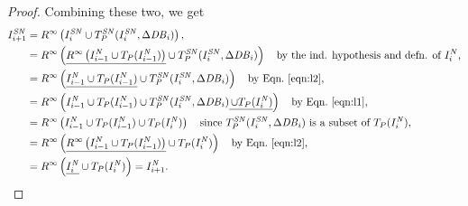 \begin{proof}
    Combining these two, we get
    \begin{align}
        I_{i+1}^{\mathit{SN}} &= R^\infty\left(I_i^{\mathit{SN}} \cup T_P^{\mathit{SN}} (I^{\mathit{SN}}_i, \Delta\mathit{DB}_i)\right),\\
        &= R^\infty\left(
            \underline{R^\infty\left(I^{\mathit{N}}_{i-1}\cup T_P(I^{\mathit{N}}_{i-1}) \right)}
        \cup T_P^{\mathit{SN}} (I^{\mathit{SN}}_i, \Delta\mathit{DB}_i)\right)\text{\quad by the ind. hypothesis and defn. of $I^N_i$,}\\
        &= R^\infty\left(
            \underline{I^{\mathit{N}}_{i-1}\cup T_P(I^N_{i-1})}
        \cup T_P^{\mathit{SN}} (I^{\mathit{SN}}_i, \Delta\mathit{DB}_i)\right)\text{\quad by Eqn.~\ref{eqn:l2},}\\
        &= R^\infty\left(I^{\mathit{N}}_{i-1}\cup T_P(I^N_{i-1}) 
        \cup T_P^{\mathit{SN}} (I^{\mathit{SN}}_i, \Delta\mathit{DB}_i)
        \underline{
            \,\cup T_P(I^{\mathit{N}}_i)
        }\right)\text{\quad 
        by Eqn.~\ref{eqn:l1},
        }\\
        &= R^\infty\left(I^{\mathit{N}}_{i-1}\cup T_P(I^N_{i-1}) 
        \cup T_P(I^{\mathit{N}}_i)\right)\text{\quad 
        since $T_P^{\mathit{SN}} (I^{\mathit{SN}}_i, \Delta\mathit{DB}_i)$ is a subset of $T_P(I^{\mathit{N}}_i)$,}\\
        &=R^\infty\left(
            \underline{
                R^\infty\left(I^{\mathit{N}}_{i-1}\cup T_P(I^N_{i-1})\right) 
            }
        \cup T_P(I^{\mathit{N}}_i)\right)\text{\quad
        by Eqn.~\ref{eqn:l2},}\\
        &=R^\infty\left(\underline{I^{\mathit{N}}_i}
        \cup T_P(I^{\mathit{N}}_i)\right)=I_{i+1}^{\mathit{N}}.
    \end{align}

\end{proof}
